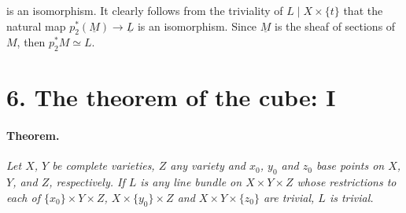 

\DeclareMathOperator{\Ima}{Im}
\DeclareMathOperator{\Ker}{Ker}
\DeclareMathOperator{\Pic}{Pic}


is an isomorphism. It clearly follows from the triviality of
$L \mid X \times \{t\}$ that the natural map
$p_2^*(\underline{M}) \to \underline{L}$ is an isomorphism. Since
$\underline{M}$ is the sheaf of sections of $M$, then $p_2^* M \simeq L$.

\section*{6. The theorem of the cube: I}

\paragraph{Theorem.}
\textit{Let $X$, $Y$ be complete varieties, $Z$ any variety and $x_0$, $y_0$
and $z_0$ base points on $X$, $Y$, and $Z$, respectively. If $L$ is any line
bundle on $X \times Y \times Z$ whose restrictions to each of
$\{x_0\} \times Y \times Z$, $X \times \{y_0\} \times Z$ and
$X \times Y \times \{z_0\}$ are trivial, $L$ is trivial.}

